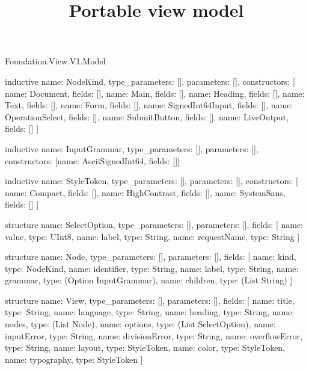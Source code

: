 \begin{lexlean}{Foundation.View.V1.Model}
\title{Portable view model}
\begin{semanticmodule}
inductive{
  name: NodeKind,
  type_parameters: [],
  parameters: [],
  constructors: [
    {name: Document, fields: []},
    {name: Main, fields: []},
    {name: Heading, fields: []},
    {name: Text, fields: []},
    {name: Form, fields: []},
    {name: SignedInt64Input, fields: []},
    {name: OperationSelect, fields: []},
    {name: SubmitButton, fields: []},
    {name: LiveOutput, fields: []}
  ]
}

inductive{
  name: InputGrammar,
  type_parameters: [],
  parameters: [],
  constructors: [{name: AsciiSignedInt64, fields: []}]
}

inductive{
  name: StyleToken,
  type_parameters: [],
  parameters: [],
  constructors: [
    {name: Compact, fields: []},
    {name: HighContrast, fields: []},
    {name: SystemSans, fields: []}
  ]
}

structure{
  name: SelectOption,
  type_parameters: [],
  parameters: [],
  fields: [
    {name: value, type: UInt8},
    {name: label, type: String},
    {name: requestName, type: String}
  ]
}

structure{
  name: Node,
  type_parameters: [],
  parameters: [],
  fields: [
    {name: kind, type: NodeKind},
    {name: identifier, type: String},
    {name: label, type: String},
    {name: grammar, type: (Option InputGrammar)},
    {name: children, type: (List String)}
  ]
}

structure{
  name: View,
  type_parameters: [],
  parameters: [],
  fields: [
    {name: title, type: String},
    {name: language, type: String},
    {name: heading, type: String},
    {name: nodes, type: (List Node)},
    {name: options, type: (List SelectOption)},
    {name: inputError, type: String},
    {name: divisionError, type: String},
    {name: overflowError, type: String},
    {name: layout, type: StyleToken},
    {name: color, type: StyleToken},
    {name: typography, type: StyleToken}
  ]
}
\end{semanticmodule}
\end{lexlean}
